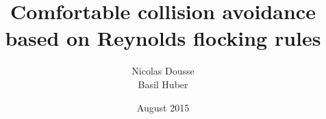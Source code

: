 \documentclass[paper=a4, twocolumn]{article}
\begin{document}
\title{Comfortable collision avoidance based on Reynolds flocking rules}
\author{Nicolas Dousse\\Basil Huber }
\date{August 2015}


\twocolumn[
	\maketitle
	\begin{abstract}
	
	\vspace{10pt}
	\end{abstract}
]












\printbibliography[title=References]
\end{document}
